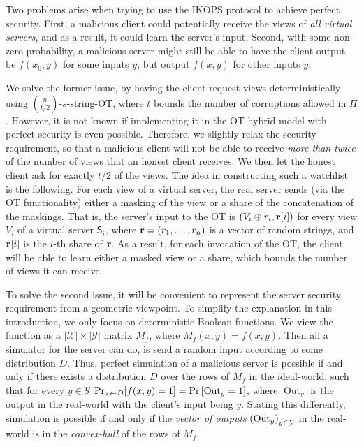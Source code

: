 \documentclass{llncs}
\newcommand{\sOT}[3]{\binom{#2}{#1}\text{-}#3\text{-string-OT}}
\newcommand{\X}{\mathcal{X}}
\newcommand{\Y}{\mathcal{Y}}
\newcommand{\Out}{\operatorname{Out}}
\renewcommand{\Sc}{\mathsf{S}}
\begin{document}
Two problems arise when trying to use the IKOPS protocol to achieve perfect security. First, a malicious client could potentially receive the views of \emph{all virtual servers}, and as a result, it could learn the server's input. Second, with some non-zero probability, a malicious server might still be able to have the client output be $f(x_0,y)$ for some inputs $y$, but output $f(x,y)$ for other inputs $y$.

We solve the former issue, by having the client request views deterministically using $\sOT{t/2}{n}{s}$, where  $t$ bounds the number of corruptions allowed in $\Pi$. However, it is not known if implementing it in the OT-hybrid model with perfect security is even possible. Therefore, we slightly relax the security requirement, so that a malicious client will not be able to receive \emph{more than twice} of the number of views that an honest client receives. We then let the honest client ask for exactly $t/2$ of the views. The idea in constructing such a watchlist is the following. For each view of a virtual server, the real server sends (via the OT functionality) either a masking of the view or a share of the concatenation of the maskings. That is, the server's input to the OT is $(V_i\oplus r_i,{\bf r}[i])$ for every view $V_i$ of a virtual server $\Sc_i$, where ${\bf r}=\left ( r_1,\ldots,r_n \right )$ is a vector of random strings, and ${\bf r}[i]$ is the $i$-th share of ${\bf r}$. As a result, for each invocation of the OT, the client will be able to learn either a masked view or a share, which bounds the number of views it can receive.

To solve the second issue, it will be convenient to represent the server security requirement from a geometric viewpoint. To simplify the explanation in this introduction, we only focus on deterministic Boolean functions. We view the function as a $|\X|\times|\Y|$ matrix $M_f$, where $M_f(x,y)=f(x,y)$. Then all a simulator for the server can do, is send a random input according to some distribution $D$. Thus, perfect simulation of a malicious server is possible if and only if there exists a distribution $D$ over the rows of $M_f$ in the ideal-world, such that for every $y\in\Y$  $\Pr_{x\from D}[f(x,y)=1]=\pr{\Out_y=1}$, where $\Out_y$ is the output in the real-world with the client's input being $y$. Stating this differently, simulation is possible if and only if the \emph{vector of outputs} $\vect{\Out_y}_{y\in\Y}$ in the real-world is in the \emph{convex-hull} of the rows of $M_f$.
\end{document}
